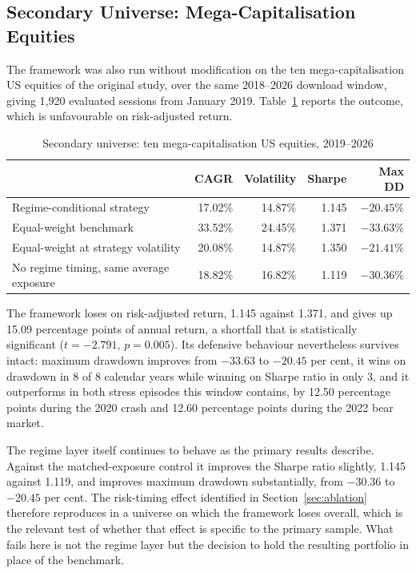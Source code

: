 \subsection{Secondary Universe: Mega-Capitalisation Equities}
\label{sec:megacap}

The framework was also run without modification on the ten mega-capitalisation US
equities of the original study, over the same 2018--2026 download window, giving 1{,}920
evaluated sessions from January 2019. Table~\ref{tab:megacap} reports the outcome, which
is unfavourable on risk-adjusted return.

\begin{table}[!ht]
\centering
\caption{Secondary universe: ten mega-capitalisation US equities, 2019--2026}
\label{tab:megacap}
\small
\begin{tabular}{p{4.8cm}rrrr}
\hline
& \textbf{CAGR} & \textbf{Volatility} & \textbf{Sharpe} & \textbf{Max DD} \\
\hline
Regime-conditional strategy & 17.02\% & 14.87\% & 1.145 & $-20.45$\% \\
Equal-weight benchmark & 33.52\% & 24.45\% & 1.371 & $-33.63$\% \\
Equal-weight at strategy volatility & 20.08\% & 14.87\% & 1.350 & $-21.41$\% \\
No regime timing, same average exposure & 18.82\% & 16.82\% & 1.119 & $-30.36$\% \\
\hline
\end{tabular}
\end{table}

The framework loses on risk-adjusted return, 1.145 against 1.371, and gives up 15.09
percentage points of annual return, a shortfall that is statistically significant
($t = -2.791$, $p = 0.005$). Its defensive behaviour nevertheless survives intact:
maximum drawdown improves from $-33.63$ to $-20.45$ per cent, it wins on drawdown in
8 of 8 calendar years while winning on Sharpe ratio in only 3, and it outperforms in
both stress episodes this window contains, by 12.50 percentage points during the 2020
crash and 12.60 percentage points during the 2022 bear market.

The regime layer itself continues to behave as the primary results describe. Against the
matched-exposure control it improves the Sharpe ratio slightly, 1.145 against 1.119, and
improves maximum drawdown substantially, from $-30.36$ to $-20.45$ per cent. The
risk-timing effect identified in Section~\ref{sec:ablation} therefore reproduces in a
universe on which the framework loses overall, which is the relevant test of whether that
effect is specific to the primary sample. What fails here is not the regime layer but the
decision to hold the resulting portfolio in place of the benchmark.

